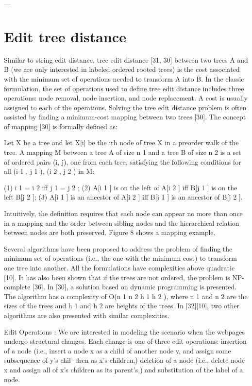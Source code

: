 ---

\section{Edit tree distance}


Similar to string edit distance, tree edit distance [31, 30] between
two trees A and B (we are only interested in labeled ordered
rooted trees) is the cost associated with the minimum set of
operations needed to transform A into B. In the classic
formulation, the set of operations used to define tree edit distance
includes three operations: node removal, node insertion, and node
replacement. A cost is usually assigned to each of the operations.
Solving the tree edit distance problem is often assisted by finding
a minimum-cost mapping between two trees [30]. The concept of
mapping [30] is formally defined as:

Let X be a tree and let X[i] be the ith node of tree X in a preorder
walk of the tree. A mapping M between a tree A of size n 1 and a
tree B of size n 2 is a set of ordered pairs (i, j), one from each tree,
satisfying the following conditions for all (i 1 , j 1 ), (i 2 , j 2 ) in M:

(1) i 1 = i 2 iff j 1 = j 2 ;
(2) A[i 1 ] is on the left of A[i 2 ] iff B[j 1 ] is on the left B[j 2 ];
(3) A[i 1 ] is an ancestor of A[i 2 ] iff B[j 1 ] is an ancestor of B[j 2 ].

Intuitively, the definition requires that each node can appear no
more than once in a mapping and the order between sibling nodes
and the hierarchical relation between nodes are both preserved.
Figure 8 shows a mapping example.

Several algorithms have been proposed to address the problem of
finding the minimum set of operations (i.e., the one with the
minimum cost) to transform one tree into another. All the
formulations have complexities above quadratic [10]. It has also
been shown that if the trees are not ordered, the problem is NP-
complete [36]. In [30], a solution based on dynamic programming
is presented. The algorithm has a complexity of O(n 1 n 2 h 1 h 2 ),
where n 1 and n 2 are the sizes of the trees and h 1 and h 2 are heights
of the trees. In [32][10], two other algorithms are also presented
with similar complexities.


Edit Operations : We are interested in modeling the scenario when
the webpages undergo structural changes. Each change is one of
three edit operations: insertion of a node (i.e., insert a node x as a
child of another node y, and assign some subsequence of y’s chil-
dren as x’s children,) deletion of a node (i.e., delete node x and
assign all of x’s children as its parent’s,) and substitution of the
label of a node.

